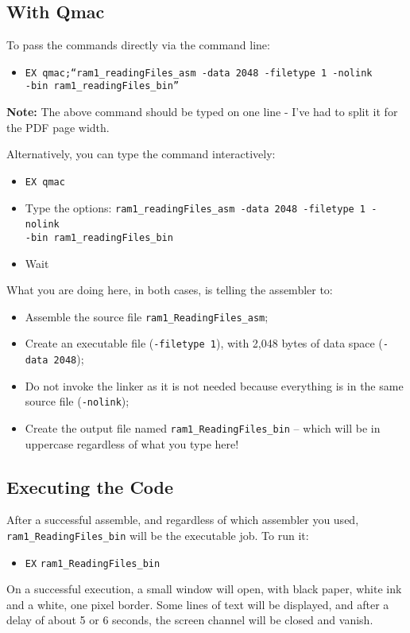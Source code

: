\subsection{With Qmac}

To pass the commands directly via the command line:
\begin{itemize}
\item \texttt{EX qmac;``ram1\_readingFiles\_asm -data 2048 -filetype 1 -nolink
}~\\
\texttt{-bin ram1\_readingFiles\_bin''}
\end{itemize}
\textbf{Note:} The above command should be typed on one line - I've
had to split it for the PDF page width. 

Alternatively, you can type the command interactively:
\begin{itemize}
\item \texttt{EX qmac}
\item Type the options: \texttt{ram1\_readingFiles\_asm -data 2048 -filetype
1 -nolink }~\\
\texttt{-bin ram1\_readingFiles\_bin}
\item Wait
\end{itemize}
What you are doing here, in both cases, is telling the assembler to:
\begin{itemize}
\item Assemble the source file \texttt{ram1\_ReadingFiles\_asm};
\item Create an executable file (\texttt{-filetype 1}), with 2,048 bytes
of data space (\texttt{-data 2048});
\item Do not invoke the linker as it is not needed because everything is
in the same source file (\texttt{-nolink});
\item Create the output file named \texttt{ram1\_ReadingFiles\_bin} --
which will be in uppercase regardless of what you type here!
\end{itemize}

\subsection{Executing the Code}

After a successful assemble, and regardless of which assembler you
used, \texttt{ram1\_ReadingFiles\_bin} will be the executable job.
To run it:
\begin{itemize}
\item \texttt{EX} \texttt{ram1\_ReadingFiles\_bin}
\end{itemize}
On a successful execution, a small window will open, with black paper,
white ink and a white, one pixel border. Some lines of text will be
displayed, and after a delay of about 5 or 6 seconds, the screen channel
will be closed and vanish.

